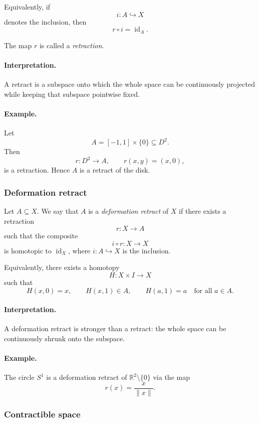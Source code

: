 \documentclass[12pt,a4paper]{article}
\theoremstyle{notespace}
\begin{document}
Equivalently, if
\[
i:A\hookrightarrow X
\]
denotes the inclusion, then
\[
r\circ i=\operatorname{id}_A.
\]

The map \(r\) is called a \emph{retraction}.

\paragraph{Interpretation.}
A retract is a subspace onto which the whole space can be continuously projected while keeping that subspace pointwise fixed.

\paragraph{Example.}
Let
\[
A=[-1,1]\times\{0\}\subseteq D^2.
\]
Then
\[
r:D^2\to A,
\qquad
r(x,y)=(x,0),
\]
is a retraction. Hence \(A\) is a retract of the disk.

\subsubsection{Deformation retract}

Let \(A\subseteq X\). We say that \(A\) is a \emph{deformation retract} of \(X\) if there exists a retraction
\[
r:X\to A
\]
such that the composite
\[
i\circ r:X\to X
\]
is homotopic to \(\operatorname{id}_X\), where \(i:A\hookrightarrow X\) is the inclusion.

Equivalently, there exists a homotopy
\[
H:X\times I\to X
\]
such that
\[
H(x,0)=x,
\qquad
H(x,1)\in A,
\qquad
H(a,1)=a
\quad\text{for all }a\in A.
\]

\paragraph{Interpretation.}
A deformation retract is stronger than a retract: the whole space can be continuously shrunk onto the subspace.

\paragraph{Example.}
The circle \(S^1\) is a deformation retract of \(\mathbb{R}^2\setminus\{0\}\) via the map
\[
r(x)=\frac{x}{\|x\|}.
\]

\subsubsection{Contractible space}
\end{document}
